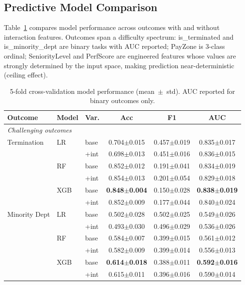 \documentclass[twocolumn]{article}
\begin{document}
\subsection{Predictive Model Comparison}

Table~\ref{tab:models} compares model performance across outcomes with and without interaction features. Outcomes span a difficulty spectrum: is\_terminated and is\_minority\_dept are binary tasks with AUC reported; PayZone is 3-class ordinal; SeniorityLevel and PerfScore are engineered features whose values are strongly determined by the input space, making prediction near-deterministic (ceiling effect).

\begin{table}[ht]
\centering
\caption{5-fold cross-validation model performance (mean~$\pm$~std). AUC reported for binary outcomes only.}
\label{tab:models}
\small
\begin{tabular}{lllccc}
\hline
Outcome & Model & Var. & Acc & F1 & AUC \\
\hline
\multicolumn{6}{l}{\textit{Challenging outcomes}} \\
Termination & LR & base & 0.704$\pm$0.015 & 0.457$\pm$0.019 & 0.835$\pm$0.017 \\
& & +int & 0.698$\pm$0.013 & 0.451$\pm$0.016 & 0.836$\pm$0.015 \\
\noalign{\smallskip}
& RF & base & 0.852$\pm$0.012 & 0.191$\pm$0.041 & 0.834$\pm$0.019 \\
& & +int & 0.854$\pm$0.013 & 0.201$\pm$0.054 & 0.829$\pm$0.018 \\
\noalign{\smallskip}
& XGB & base & \textbf{0.848$\pm$0.004} & 0.150$\pm$0.028 & \textbf{0.838$\pm$0.019} \\
& & +int & 0.852$\pm$0.009 & 0.177$\pm$0.044 & 0.840$\pm$0.024 \\
\noalign{\medskip}
Minority Dept & LR & base & 0.502$\pm$0.028 & 0.502$\pm$0.025 & 0.549$\pm$0.026 \\
& & +int & 0.493$\pm$0.030 & 0.496$\pm$0.029 & 0.536$\pm$0.026 \\
\noalign{\smallskip}
& RF & base & 0.584$\pm$0.007 & 0.399$\pm$0.015 & 0.561$\pm$0.012 \\
& & +int & 0.582$\pm$0.009 & 0.399$\pm$0.014 & 0.556$\pm$0.013 \\
\noalign{\smallskip}
& XGB & base & \textbf{0.614$\pm$0.018} & 0.388$\pm$0.011 & \textbf{0.592$\pm$0.016} \\
& & +int & 0.615$\pm$0.011 & 0.396$\pm$0.016 & 0.590$\pm$0.014 \\

\end{tabular}
\end{table}
\end{document}
